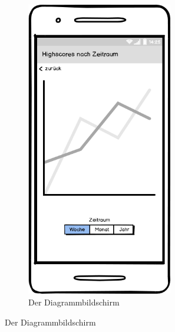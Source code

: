 \begin{figure}[htbp]
\begin{subfigure}{.33\textwidth}
  \includegraphics[width=0.7\textwidth]{img/stat_daily.png}
  \caption{Der Diagrammbildschirm}
\end{subfigure}
\end{figure}

